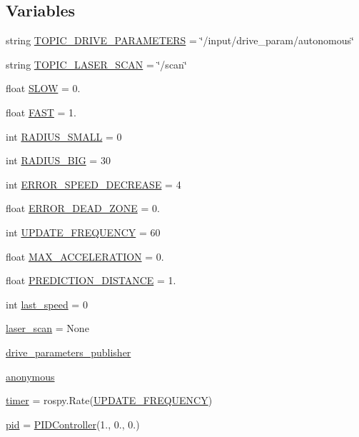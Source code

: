 \subsection*{Variables}
\begin{DoxyCompactItemize}
\item 
string \hyperlink{namespacewallfollowing_a765ce45df7d0c3d9134fc83534029e36}{T\+O\+P\+I\+C\+\_\+\+D\+R\+I\+V\+E\+\_\+\+P\+A\+R\+A\+M\+E\+T\+E\+RS} = \char`\"{}/input/drive\+\_\+param/autonomous\char`\"{}
\item 
string \hyperlink{namespacewallfollowing_a7e38e617465ebdfa7ec0576ac63443f8}{T\+O\+P\+I\+C\+\_\+\+L\+A\+S\+E\+R\+\_\+\+S\+C\+AN} = \char`\"{}/scan\char`\"{}
\item 
float \hyperlink{namespacewallfollowing_a30a4013dbd3a6ea5275fbed3fe35da22}{S\+L\+OW} = 0.
\item 
float \hyperlink{namespacewallfollowing_ab1e7c06b4efb8e38a97ac8ec783a6beb}{F\+A\+ST} = 1.
\item 
int \hyperlink{namespacewallfollowing_aa59c6dfd10cb4f1550367b3268417436}{R\+A\+D\+I\+U\+S\+\_\+\+S\+M\+A\+LL} = 0
\item 
int \hyperlink{namespacewallfollowing_a4b502375f79f9fcc2a823cc60da7bee0}{R\+A\+D\+I\+U\+S\+\_\+\+B\+IG} = 30
\item 
int \hyperlink{namespacewallfollowing_a205d8fd2e51cc16818cb679f6c87c861}{E\+R\+R\+O\+R\+\_\+\+S\+P\+E\+E\+D\+\_\+\+D\+E\+C\+R\+E\+A\+SE} = 4
\item 
float \hyperlink{namespacewallfollowing_ac87d5f143cfd44f170a1d385ebd1a71b}{E\+R\+R\+O\+R\+\_\+\+D\+E\+A\+D\+\_\+\+Z\+O\+NE} = 0.
\item 
int \hyperlink{namespacewallfollowing_a7ba7bea964894fd6f3def270bd3afa43}{U\+P\+D\+A\+T\+E\+\_\+\+F\+R\+E\+Q\+U\+E\+N\+CY} = 60
\item 
float \hyperlink{namespacewallfollowing_acc4e21a1971c33663609d022c899c167}{M\+A\+X\+\_\+\+A\+C\+C\+E\+L\+E\+R\+A\+T\+I\+ON} = 0.
\item 
float \hyperlink{namespacewallfollowing_a40e67d731c86a71ce7d1b8c17bff0514}{P\+R\+E\+D\+I\+C\+T\+I\+O\+N\+\_\+\+D\+I\+S\+T\+A\+N\+CE} = 1.
\item 
int \hyperlink{namespacewallfollowing_a9ee8d77a4629b5d8ecb2899da6e3a7fe}{last\+\_\+speed} = 0
\item 
\hyperlink{namespacewallfollowing_a35ff373c811db70d98205347a736c606}{laser\+\_\+scan} = None
\item 
\hyperlink{namespacewallfollowing_aa69138defbbc5f21e99db50a6b3c903f}{drive\+\_\+parameters\+\_\+publisher}
\item 
\hyperlink{namespacewallfollowing_a005968f85117845c036ef1cbd61034bb}{anonymous}
\item 
\hyperlink{namespacewallfollowing_a57288dd797e0bd15012f3ebf1670ce38}{timer} = rospy.\+Rate(\hyperlink{namespacewallfollowing_a7ba7bea964894fd6f3def270bd3afa43}{U\+P\+D\+A\+T\+E\+\_\+\+F\+R\+E\+Q\+U\+E\+N\+CY})
\item 
\hyperlink{namespacewallfollowing_adc9f95e0b626be8ddae98a596a38e7e8}{pid} = \hyperlink{classwallfollowing_1_1_p_i_d_controller}{P\+I\+D\+Controller}(1., 0., 0.)
\end{DoxyCompactItemize}


